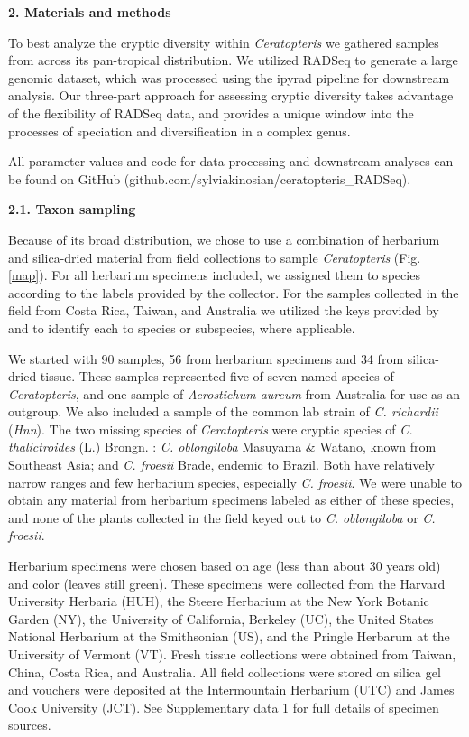 \documentclass[12pt]{article}
\begin{document}
\begin{flushleft}
\vspace{1cm}

{\large\textbf{2. Materials and methods}}

To best analyze the cryptic diversity within \textit{Ceratopteris} we gathered samples from across its pan-tropical distribution. We utilized RADSeq to generate a large genomic dataset, which was processed using the ipyrad pipeline \autocite{Eaton2020} for downstream analysis. Our three-part approach for assessing cryptic diversity takes advantage of the flexibility of RADSeq data, and provides a unique window into the processes of speciation and diversification in a complex genus. 

All parameter values and code for data processing and downstream analyses can be found on GitHub (github.com/sylviakinosian/ceratopteris\_RADSeq).

\textbf{2.1. Taxon sampling}

Because of its broad distribution, we chose to use a combination of herbarium and silica-dried material from field collections to sample \textit{Ceratopteris} (Fig. \ref{map}). For all herbarium specimens included, we assigned them to species according to the labels provided by the collector. For the samples collected in the field from Costa Rica, Taiwan, and Australia we utilized the keys provided by \textcite{LloydTax1974} and \textcite{Masuyama2010} to identify each to species or subspecies, where applicable. 

We started with 90 samples, 56 from herbarium specimens and 34 from silica-dried tissue. These samples represented five of seven named species of \textit{Ceratopteris}, and one sample of \textit{Acrostichum aureum} from Australia for use as an outgroup. We also included a sample of the common lab strain of \textit{C. richardii} (\textit{Hnn}). The two missing species of \textit{Ceratopteris} were cryptic species of \textit{C. thalictroides} (L.) Brongn. \autocite{Masuyama2010}: \textit{C. oblongiloba} Masuyama \& Watano, known from Southeast Asia; and \textit{C. froesii} Brade, endemic to Brazil. Both have relatively narrow ranges and few herbarium species, especially \textit{C. froesii}. We were unable to obtain any material from herbarium specimens labeled as either of these species, and none of the plants collected in the field keyed out to \textit{C. oblongiloba} or \textit{C. froesii}. 

Herbarium specimens were chosen based on age (less than about 30 years old) and color (leaves still green). These specimens were collected from the Harvard University Herbaria (HUH), the Steere Herbarium at the New York Botanic Garden (NY), the University of California, Berkeley (UC), the United States National Herbarium at the Smithsonian (US), and the Pringle Herbarum at the University of Vermont (VT). Fresh tissue collections were obtained from Taiwan, China, Costa Rica, and Australia. All field collections were stored on silica gel and vouchers were deposited at the Intermountain Herbarium (UTC) and James Cook University (JCT). See Supplementary data 1 for full details of specimen sources.


\end{flushleft}
\end{document}

